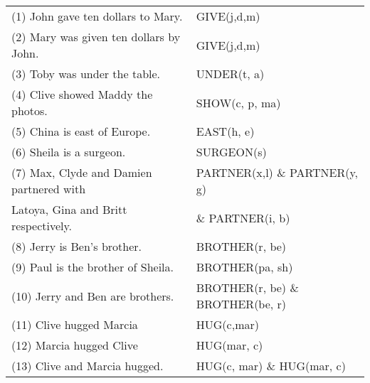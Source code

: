 \documentclass{article}
\begin{document}
\begin{tabular}{l|l}
(1) John gave ten dollars to Mary.  & GIVE(j,d,m) \\
(2) Mary was given ten dollars by John. & GIVE(j,d,m) \\
(3) Toby was under the table.   &  UNDER(t, a)\\
(4) Clive showed Maddy the photos.  &  SHOW(c, p, ma)\\
(5) China is east of Europe.    & EAST(h, e)\\
(6) Sheila is a surgeon.    & SURGEON(s)\\
(7) Max, Clyde and Damien partnered with & PARTNER(x,l) \& PARTNER(y, g) \\
Latoya, Gina and Britt respectively.   & \& PARTNER(i, b)\\
(8) Jerry is Ben’s brother. & BROTHER(r, be)\\
(9) Paul is the brother of Sheila.  & BROTHER(pa, sh)\\
(10) Jerry and Ben are brothers.    & BROTHER(r, be) \& BROTHER(be, r)\\
(11) Clive hugged Marcia & HUG(c,mar) \\
(12) Marcia hugged Clive & HUG(mar, c)\\
(13) Clive and Marcia hugged. & HUG(c, mar) \& HUG(mar, c)\\
\end{tabular}
\end{document}
